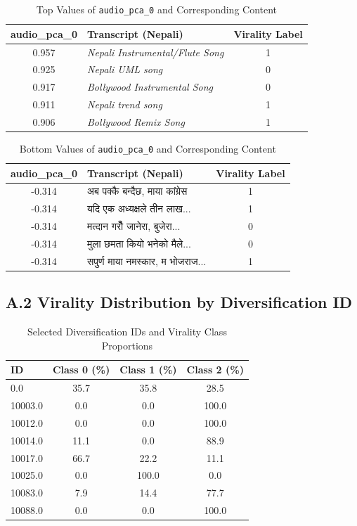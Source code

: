 \documentclass[12pt,a4paper]{report}
\begin{document}
\begin{table}[H]
\centering
\caption{Top Values of \texttt{audio\_pca\_0} and Corresponding Content}
\label{tab:audio_pca_high}
\begin{tabular}{clc}
\toprule
\textbf{audio\_pca\_0} & \textbf{Transcript (Nepali)} & \textbf{Virality Label} \\
\midrule
0.957 & \textit{Nepali Instrumental/Flute Song} & 1 \\
0.925 & \textit{Nepali UML song} & 0 \\
0.917 & \textit{Bollywood Instrumental Song} & 0 \\
0.911 & \textit{Nepali trend song} & 1 \\
0.906 & \textit{Bollywood Remix Song} & 1 \\
\bottomrule
\end{tabular}
\end{table}

\begin{table}[H]
\centering
\caption{Bottom Values of \texttt{audio\_pca\_0} and Corresponding Content}
\label{tab:audio_pca_low}
\begin{tabular}{clc}
\toprule
\textbf{audio\_pca\_0} & \textbf{Transcript (Nepali)} & \textbf{Virality Label} \\
\midrule
-0.314 & \texthindi{अब पक्कै बन्दैछ, माया कांग्रेस} & 1 \\
-0.314 & \texthindi{यदि एक अध्यक्षले तीन लाख...} & 1 \\
-0.314 & \texthindi{मत्दान गरौँ जानेरा, बुजेरा...} & 0 \\
-0.314 & \texthindi{मुला छमता कियो भनेको मैले...} & 0 \\
-0.314 & \texthindi{सपुर्ण माया नमस्कार, म भोजराज...} & 1 \\
\bottomrule
\end{tabular}
\end{table}

\subsection*{A.2 Virality Distribution by Diversification ID}

\begin{table}[H]
\centering
\caption{Selected Diversification IDs and Virality Class Proportions}
\label{tab:div_id_count}
\begin{tabular}{lccc}
\toprule
\textbf{ID} & \textbf{Class 0 (\%)} & \textbf{Class 1 (\%)} & \textbf{Class 2 (\%)} \\
\midrule
0.0 & 35.7 & 35.8 & 28.5 \\
10003.0 & 0.0 & 0.0 & 100.0 \\
10012.0 & 0.0 & 0.0 & 100.0 \\
10014.0 & 11.1 & 0.0 & 88.9 \\
10017.0 & 66.7 & 22.2 & 11.1 \\
10025.0 & 0.0 & 100.0 & 0.0 \\
10083.0 & 7.9 & 14.4 & 77.7 \\
10088.0 & 0.0 & 0.0 & 100.0 \\
\bottomrule
\end{tabular}
\end{table}
\end{document}
